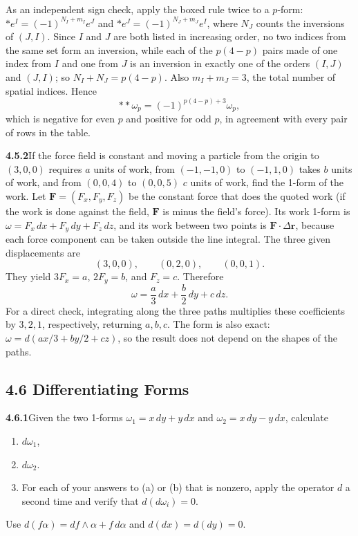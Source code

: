 As an independent sign check, apply the boxed rule twice to a $p$-form:
$*e^I=(-1)^{N_I+m_I}e^J$ and $*e^J=(-1)^{N_J+m_J}e^I$, where $N_J$
counts the inversions of $(J,I)$. Since $I$ and $J$ are both listed in
increasing order, no two indices from the same set form an inversion,
while each of the $p(4-p)$ pairs made of one index from $I$ and one
from $J$ is an inversion in exactly one of the orders $(I,J)$ and
$(J,I)$; so $N_I+N_J=p(4-p)$. Also $m_I+m_J=3$, the total number of
spatial indices. Hence
\[
{*}{*}\omega_p=(-1)^{p(4-p)+3}\omega_p,
\]
which is negative for even $p$ and positive for odd $p$, in agreement
with every pair of rows in the table.

\par\bigskip
\noindent\textbf{4.5.2}\quad If the force field is constant and moving a
particle from the origin to $(3,0,0)$ requires $a$ units of work, from
$(-1,-1,0)$ to $(-1,1,0)$ takes $b$ units of work, and from $(0,0,4)$ to
$(0,0,5)$ $c$ units of work, find the 1-form of the work.
\solution
Let $\mathbf F=(F_x,F_y,F_z)$ be the constant force that does the quoted
work (if the work is done against the field, $\mathbf F$ is minus the
field's force). Its work 1-form is
$\omega=F_x\,dx+F_y\,dy+F_z\,dz$, and its work between two points is
$\mathbf F\cdot\Delta\mathbf r$, because each force component can be
taken outside the line integral. The three given displacements are
\[
(3,0,0),\qquad (0,2,0),\qquad (0,0,1).
\]
They yield $3F_x=a$, $2F_y=b$, and $F_z=c$. Therefore
\[
\boxed{\omega=\frac a3\,dx+\frac b2\,dy+c\,dz}.
\]
For a direct check, integrating along the three paths multiplies these
coefficients by $3,2,1$, respectively, returning $a,b,c$. The form is
also exact:
$\omega=d(ax/3+by/2+cz)$, so the result does not depend on the shapes
of the paths.

\subsection*{4.6 Differentiating Forms}

\par\bigskip
\noindent\textbf{4.6.1}\quad Given the two 1-forms $\omega_{1}=x\,dy+y\,dx$
and $\omega_{2}=x\,dy-y\,dx$, calculate
\begin{enumerate}
\item[(a)] $d\omega_{1}$,
\item[(b)] $d\omega_{2}$.
\item[(c)] For each of your answers to (a) or (b) that is nonzero, apply the
  operator $d$ a second time and verify that $d(d\omega_{i})=0$.
\end{enumerate}
\solution
Use $d(f\alpha)=df\wedge\alpha+f\,d\alpha$ and
$d(dx)=d(dy)=0$.

